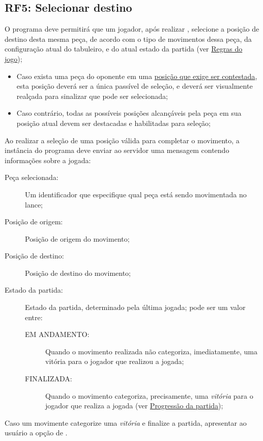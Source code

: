 \subsection{RF5: Selecionar destino} \label{subsection:RF5}
O programa deve permitirá que um jogador, após realizar , selecione a posição de
destino desta mesma peça, de acordo com o tipo de movimentos dessa peça, da configuração atual do tabuleiro, e do atual
estado da partida (ver \hyperref[section:regras]{Regras do jogo});
\begin{itemize}
  \item Caso exista uma peça do oponente em uma \hyperref[section:progressao]{posição que exige ser contestada}, esta
    posição deverá ser a única passível de seleção, e deverá ser visualmente realçada para sinalizar que pode ser
    selecionada;
  \item Caso contrário, todas as possíveis posições alcançáveis pela peça em sua posição atual devem ser destacadas e
    habilitadas para seleção;
\end{itemize}
Ao realizar a seleção de uma posição válida para completar o movimento, a instância do programa deve enviar ao servidor
uma mensagem contendo informações sobre a jogada:

\begin{description}
  \item[Peça selecionada:] Um identificador que especifique qual peça está sendo movimentada no lance;
  \item[Posição de origem:] Posição de origem do movimento;
  \item[Posição de destino:] Posição de destino do movimento;
  \item[Estado da partida:] Estado da partida, determinado pela última jogada; pode ser um valor entre:
    \begin{description}
      \item[EM ANDAMENTO:] Quando o movimento realizada não categoriza, imediatamente, uma vitória para o jogador que
        realizou a jogada;
      \item[FINALIZADA:] Quando o movimento categoriza, precisamente, uma \textit{vitória} para o jogador que realiza a
        jogada (ver \hyperref[section:progressao]{Progressão da partida});
    \end{description}
\end{description}
Caso um movimente categorize uma \textit{vitória} e finalize a partida, apresentar ao usuário a opção de
.

